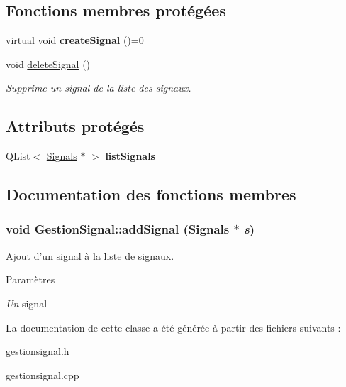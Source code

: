 \subsection*{Fonctions membres protégées}
\begin{DoxyCompactItemize}
\item 
\hypertarget{classGestionSignal_a1e4fb5f2fa8c0f844639f6bd84ff701b}{
virtual void {\bfseries createSignal} ()=0}
\label{classGestionSignal_a1e4fb5f2fa8c0f844639f6bd84ff701b}

\item 
\hypertarget{classGestionSignal_adf3f0a7f9445d4b81c24aba5adaa89e2}{
void \hyperlink{classGestionSignal_adf3f0a7f9445d4b81c24aba5adaa89e2}{deleteSignal} ()}
\label{classGestionSignal_adf3f0a7f9445d4b81c24aba5adaa89e2}

\begin{DoxyCompactList}\small\item\em Supprime un signal de la liste des signaux. \item\end{DoxyCompactList}\end{DoxyCompactItemize}
\subsection*{Attributs protégés}
\begin{DoxyCompactItemize}
\item 
\hypertarget{classGestionSignal_a6e8cffa17bc2f240d2ab3cdba9b3f53d}{
QList$<$ \hyperlink{classSignals}{Signals} $\ast$ $>$ {\bfseries listSignals}}
\label{classGestionSignal_a6e8cffa17bc2f240d2ab3cdba9b3f53d}

\end{DoxyCompactItemize}


\subsection{Documentation des fonctions membres}
\hypertarget{classGestionSignal_a0b729617a3132c6f3227072511ffcb63}{
\subsubsection[{addSignal}]{\setlength{\rightskip}{0pt plus 5cm}void GestionSignal::addSignal ({\bf Signals} $\ast$ {\em s})}}
\label{classGestionSignal_a0b729617a3132c6f3227072511ffcb63}


Ajout d'un signal à la liste de signaux. 


\begin{DoxyParams}{Paramètres}
\item[{\em Un}]signal \end{DoxyParams}


La documentation de cette classe a été générée à partir des fichiers suivants :\begin{DoxyCompactItemize}
\item 
gestionsignal.h\item 
gestionsignal.cpp\end{DoxyCompactItemize}
